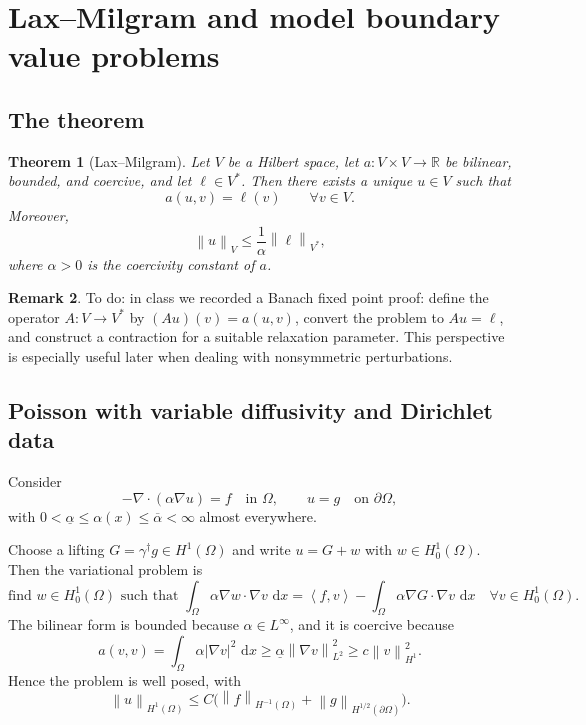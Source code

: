 \documentclass[11pt]{article}
\newtheorem{theorem}{Theorem}[section]
\theoremstyle{definition}
\newtheorem{remark}[theorem]{Remark}
\newcommand{\R}{\mathbb{R}}
\newcommand{\dd}{\,\mathrm{d}}
\newcommand{\ip}[2]{\left\langle #1,#2\right\rangle}
\newcommand{\norm}[1]{\left\lVert #1\right\rVert}
\newcommand{\abs}[1]{\left\lvert #1\right\rvert}
\begin{document}
\section{Lax--Milgram and model boundary value problems}

\subsection{The theorem}

\begin{theorem}[Lax--Milgram]
Let $V$ be a Hilbert space, let $a:V\times V\to\R$ be bilinear, bounded, and coercive, and let $\ell\in V^*$. Then there exists a unique $u\in V$ such that
\[
a(u,v)=\ell(v) \qquad \forall v\in V.
\]
Moreover,
\[
\norm{u}_V \le \frac{1}{\alpha}\norm{\ell}_{V^*},
\]
where $\alpha>0$ is the coercivity constant of $a$.
\end{theorem}

\begin{remark}
To do: in class we recorded a Banach fixed point proof: define the operator $A:V\to V^*$ by $(Au)(v)=a(u,v)$, convert the problem to $Au=\ell$, and construct a contraction for a suitable relaxation parameter. This perspective is especially useful later when dealing with nonsymmetric perturbations.
\end{remark}

\subsection{Poisson with variable diffusivity and Dirichlet data}

Consider
\[
-\nabla\cdot(\alpha\nabla u)=f \quad \text{in } \Omega,
\qquad u=g \quad \text{on } \partial\Omega,
\]
with $0<\underline\alpha\le \alpha(x)\le \overline\alpha<\infty$ almost everywhere.

Choose a lifting $G=\gamma^\dagger g\in H^1(\Omega)$ and write $u=G+w$ with $w\in H_0^1(\Omega)$. Then the variational problem is
\[
\text{find } w\in H_0^1(\Omega) \text{ such that }
\int_\Omega \alpha\nabla w\cdot\nabla v\,\dd x
= \ip{f}{v} - \int_\Omega \alpha\nabla G\cdot\nabla v\,\dd x
\quad \forall v\in H_0^1(\Omega).
\]
The bilinear form is bounded because $\alpha\in L^\infty$, and it is coercive because
\[
a(v,v)=\int_\Omega \alpha\abs{\nabla v}^2\,\dd x \ge \underline\alpha\norm{\nabla v}_{L^2}^2 \ge c\norm{v}_{H^1}^2.
\]
Hence the problem is well posed, with
\[
\norm{u}_{H^1(\Omega)} \le C\big(\norm{f}_{H^{-1}(\Omega)} + \norm{g}_{H^{1/2}(\partial\Omega)}\big).
\]
\end{document}

